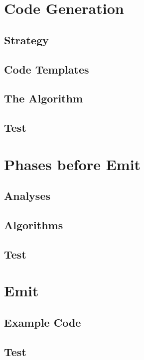 \documentclass{article}
\begin{document}
\section{Code Generation}

\subsection{Strategy}

\subsection{Code Templates}

\subsection{The Algorithm}

\subsection{Test}

\section{Phases before Emit}

\subsection{Analyses}

\subsection{Algorithms}

\subsection{Test}

\section{Emit}

\subsection{Example Code}

\subsection{Test}
\end{document}
